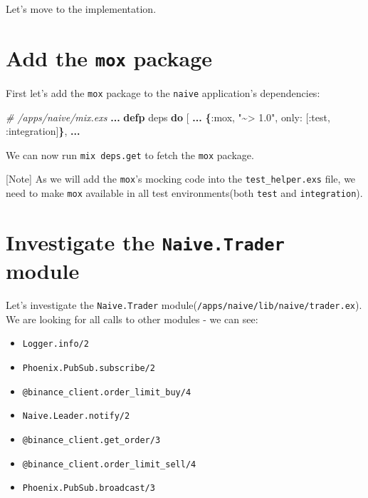 \documentclass[
  oneside]{book}
\newenvironment{Shaded}{\begin{snugshade}}{\end{snugshade}}
\newcommand{\CommentTok}[1]{\textcolor[rgb]{0.56,0.35,0.01}{\textit{#1}}}
\newcommand{\FunctionTok}[1]{\textcolor[rgb]{0.13,0.29,0.53}{\textbf{#1}}}
\newcommand{\KeywordTok}[1]{\textcolor[rgb]{0.13,0.29,0.53}{\textbf{#1}}}
\newcommand{\NormalTok}[1]{#1}
\newcommand{\OperatorTok}[1]{\textcolor[rgb]{0.81,0.36,0.00}{\textbf{#1}}}
\newcommand{\OtherTok}[1]{\textcolor[rgb]{0.56,0.35,0.01}{#1}}
\newcommand{\StringTok}[1]{\textcolor[rgb]{0.31,0.60,0.02}{#1}}
\newcommand{\VariableTok}[1]{\textcolor[rgb]{0.00,0.00,0.00}{#1}}
\providecommand{\tightlist}{%
  \setlength{\itemsep}{0pt}\setlength{\parskip}{0pt}}
\begin{document}
Let's move to the implementation.

\section{\texorpdfstring{Add the \texttt{mox} package}{Add the mox package}}\label{add-the-mox-package}

First let's add the \texttt{mox} package to the \texttt{naive} application's dependencies:

\begin{Shaded}
\begin{Highlighting}[]
\CommentTok{\# /apps/naive/mix.exs}
  \OperatorTok{...}
  \KeywordTok{defp}\NormalTok{ deps }\KeywordTok{do}
    \OtherTok{[}
      \OperatorTok{...}
      \FunctionTok{\{}\VariableTok{:mox}\NormalTok{, }\StringTok{"\textasciitilde{}\textgreater{} 1.0"}\NormalTok{, }\VariableTok{only:} \OtherTok{[}\VariableTok{:test}\NormalTok{, }\VariableTok{:integration}\OtherTok{]}\FunctionTok{\}}\NormalTok{,}
      \OperatorTok{...}
\end{Highlighting}
\end{Shaded}

We can now run \texttt{mix\ deps.get} to fetch the \texttt{mox} package.

{[}Note{]} As we will add the \texttt{mox}'s mocking code into the \texttt{test\_helper.exs} file, we need to
make \texttt{mox} available in all test environments(both \texttt{test} and \texttt{integration}).

\section{\texorpdfstring{Investigate the \texttt{Naive.Trader} module}{Investigate the Naive.Trader module}}\label{investigate-the-naive.trader-module}

Let's investigate the \texttt{Naive.Trader} module(\texttt{/apps/naive/lib/naive/trader.ex}). We are looking for all calls to other modules - we can see:

\begin{itemize}
\tightlist
\item
  \texttt{Logger.info/2}
\item
  \texttt{Phoenix.PubSub.subscribe/2}
\item
  \texttt{@binance\_client.order\_limit\_buy/4}
\item
  \texttt{Naive.Leader.notify/2}
\item
  \texttt{@binance\_client.get\_order/3}
\item
  \texttt{@binance\_client.order\_limit\_sell/4}
\item
  \texttt{Phoenix.PubSub.broadcast/3}
\end{itemize}
\end{document}
